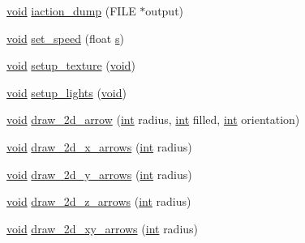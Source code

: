 \begin{DoxyCompactItemize}
\item 
\hyperlink{wglext_8h_a9e6b7f1933461ef318bb000d6bd13b83}{void} \hyperlink{class_g_l_u_i___translation_ab63de002536cd569083b07006fb3d430}{iaction\+\_\+dump} (F\+I\+L\+E $\ast$output)
\item 
\hyperlink{wglext_8h_a9e6b7f1933461ef318bb000d6bd13b83}{void} \hyperlink{class_g_l_u_i___translation_ad05a9584781a60bbbba6a9646dd43f1b}{set\+\_\+speed} (float \hyperlink{glext_8h_a4af680a6c683f88ed67b76f207f2e6e4}{s})
\item 
\hyperlink{wglext_8h_a9e6b7f1933461ef318bb000d6bd13b83}{void} \hyperlink{class_g_l_u_i___translation_a1ad1f0412c0c4668701dee4dc03ef07f}{setup\+\_\+texture} (\hyperlink{wglext_8h_a9e6b7f1933461ef318bb000d6bd13b83}{void})
\item 
\hyperlink{wglext_8h_a9e6b7f1933461ef318bb000d6bd13b83}{void} \hyperlink{class_g_l_u_i___translation_a4f8bc171843cccb40d645f7eb955f4af}{setup\+\_\+lights} (\hyperlink{wglext_8h_a9e6b7f1933461ef318bb000d6bd13b83}{void})
\item 
\hyperlink{wglext_8h_a9e6b7f1933461ef318bb000d6bd13b83}{void} \hyperlink{class_g_l_u_i___translation_afc0c9da0f9ef84a04bbe11948e154a5c}{draw\+\_\+2d\+\_\+arrow} (\hyperlink{wglext_8h_a500a82aecba06f4550f6849b8099ca21}{int} radius, \hyperlink{wglext_8h_a500a82aecba06f4550f6849b8099ca21}{int} filled, \hyperlink{wglext_8h_a500a82aecba06f4550f6849b8099ca21}{int} orientation)
\item 
\hyperlink{wglext_8h_a9e6b7f1933461ef318bb000d6bd13b83}{void} \hyperlink{class_g_l_u_i___translation_af7263c8185a6a5320a74310e1f4856b6}{draw\+\_\+2d\+\_\+x\+\_\+arrows} (\hyperlink{wglext_8h_a500a82aecba06f4550f6849b8099ca21}{int} radius)
\item 
\hyperlink{wglext_8h_a9e6b7f1933461ef318bb000d6bd13b83}{void} \hyperlink{class_g_l_u_i___translation_a1ce40628f56baf117cd9c616efaeff6e}{draw\+\_\+2d\+\_\+y\+\_\+arrows} (\hyperlink{wglext_8h_a500a82aecba06f4550f6849b8099ca21}{int} radius)
\item 
\hyperlink{wglext_8h_a9e6b7f1933461ef318bb000d6bd13b83}{void} \hyperlink{class_g_l_u_i___translation_aa639401a16c5160b758ab8a5ccfd4a3d}{draw\+\_\+2d\+\_\+z\+\_\+arrows} (\hyperlink{wglext_8h_a500a82aecba06f4550f6849b8099ca21}{int} radius)
\item 
\hyperlink{wglext_8h_a9e6b7f1933461ef318bb000d6bd13b83}{void} \hyperlink{class_g_l_u_i___translation_a6e9b8fcb46e704c0131b42b3ef56165c}{draw\+\_\+2d\+\_\+xy\+\_\+arrows} (\hyperlink{wglext_8h_a500a82aecba06f4550f6849b8099ca21}{int} radius)
\item 

\end{DoxyCompactItemize}
